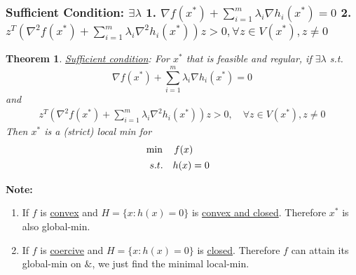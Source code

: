 \documentclass[11pt,a4paper]{article}
\newtheorem{theorem}{Theorem}
\begin{document}
\subsubsection{Sufficient Condition: $\exists\lambda$ 1. $\nabla f(x^*)+\sum_{i=1}^m\lambda_i \nabla h_i(x^*)=0$ 2. $z^T\left(\nabla^2 f(x^*)+\sum_{i=1}^m\lambda_i \nabla^2 h_i(x^*)\right)z> 0,\forall z\in V(x^*),z\neq 0$}
\begin{theorem}
    \underline{Sufficient condition}: For $x^*$ that is feasible and regular, if $\exists \lambda$ s.t.
    \begin{equation}
        \nabla f(x^*)+\sum_{i=1}^m\lambda_i \nabla h_i(x^*)=0
        \nonumber
    \end{equation}
    and
    \begin{equation}
        \begin{aligned}
            z^T\left(\nabla^2 f(x^*)+\sum_{i=1}^m\lambda_i \nabla^2 h_i(x^*)\right)z> 0,\quad \forall z\in V(x^*),z\neq 0
        \end{aligned}
        \nonumber
    \end{equation}
    Then $x^*$ is a (strict) local min for \begin{align*}
        &\min\quad f(x)\\
        &\begin{array}{r@{\quad}r@{}l@{\quad}l}
        s.t.
        &h(x)=0&\\
    \end{array}
    \end{align*}
\end{theorem}
\textbf{Note:}
\begin{enumerate}[(1)]
    \item If $f$ is \underline{convex} and $H=\{x:h(x)=0\}$ is \underline{convex and closed}. Therefore $x^*$ is also global-min.
    \item If $f$ is \underline{coercive} and $H=\{x:h(x)=0\}$ is \underline{closed}. Therefore $f$ can attain its global-min on $\&$, we just find the minimal local-min.
\end{enumerate}
\end{document}
